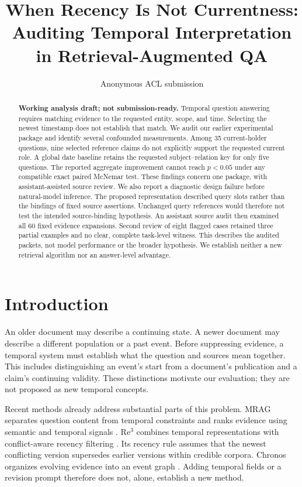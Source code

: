 \documentclass[11pt]{article}
\title{When Recency Is Not Currentness:\\Auditing Temporal Interpretation in Retrieval-Augmented QA}
\author{Anonymous ACL submission}
\begin{document}
\maketitle
\begin{abstract}
\textbf{Working analysis draft; not submission-ready.}
Temporal question answering requires matching evidence to the requested entity, scope, and time.
Selecting the newest timestamp does not establish that match.
We audit our earlier experimental package and identify several confounded measurements.
Among 35 current-holder questions, nine selected reference claims do not explicitly support the requested current role.
A global date baseline retains the requested subject--relation key for only five questions.
The reported aggregate improvement cannot reach $p<0.05$ under any compatible exact paired McNemar test.
These findings concern one package, with assistant-assisted source review.
We also report a diagnostic design failure before natural-model inference.
The proposed representation described query slots rather than the bindings of fixed source assertions.
Unchanged query references would therefore not test the intended source-binding hypothesis.
An assistant source audit then examined all 60 fixed evidence expansions.
Second review of eight flagged cases retained three partial examples and no clear, complete task-level witness.
This describes the audited packets, not model performance or the broader hypothesis.
We establish neither a new retrieval algorithm nor an answer-level advantage.
\end{abstract}

\section{Introduction}

An older document may describe a continuing state.
A newer document may describe a different population or a past event.
Before suppressing evidence, a temporal system must establish what the question and sources mean together.
This includes distinguishing an event's start from a document's publication and a claim's continuing validity.
These distinctions motivate our evaluation; they are not proposed as new temporal concepts.

Recent methods already address substantial parts of this problem.
MRAG separates question content from temporal constraints and ranks evidence using semantic and temporal signals \citep{zhang2025mrag}.
Re$^3$ combines temporal representations with conflict-aware recency filtering \citep{cao2026re3}.
Its recency rule assumes that the newest conflicting version supersedes earlier versions within credible corpora.
Chronos organizes evolving evidence into an event graph \citep{liu2026chronos}.
Adding temporal fields or a revision prompt therefore does not, alone, establish a new method.
\end{document}
